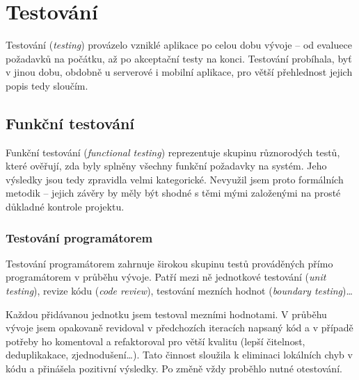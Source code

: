 
\chapter{Testování}
Testování (\textit{testing}) provázelo vzniklé aplikace po celou dobu vývoje -- od evaluece požadavků na počátku, až po akceptační testy na konci. Testování probíhala, byť v jinou dobu, obdobně u serverové i mobilní aplikace, pro větší přehlednost jejich popis tedy sloučím.

\section{Funkční testování}
Funkční testování (\textit{functional testing}) reprezentuje skupinu různorodých testů, které ověřují, zda byly splněny všechny funkční požadavky na systém. Jeho výsledky jsou tedy zpravidla velmi kategorické. Nevyužil jsem proto formálních metodik -- jejich závěry by měly být shodné s těmi mými založenými na prosté důkladné kontrole projektu.

\subsection{Testování programátorem}
Testování programátorem zahrnuje širokou skupinu testů prováděných přímo programátorem v průběhu vývoje. Patří mezi ně jednotkové testování (\textit{unit testing}), revize kódu (\textit{code review}), testování mezních hodnot (\textit{boundary testing})\dots

Každou přidávanou jednotku jsem testoval mezními hodnotami. V průběhu vývoje jsem opakovaně revidoval v předchozích iteracích napsaný kód a v případě potřeby ho komentoval a refaktoroval pro větší kvalitu (lepší čitelnost, deduplikakace, zjednodušení\dots). Tato činnost sloužila k eliminaci lokálních chyb v kódu a přinášela pozitivní výsledky. Po změně vždy proběhlo nutné otestování.



